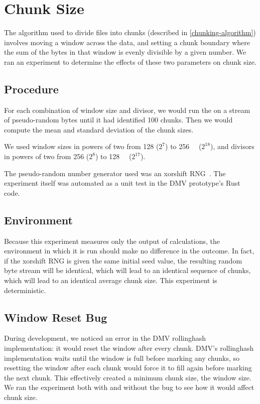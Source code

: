 \section{Chunk Size}\label{rolling-hash-exp}

The algorithm used to divide files into chunks (described in
\autoref{chunking-algorithm}) involves moving a window across the data, and
setting a chunk boundary where the sum of the bytes in that window is evenly
divisible by a given number. We ran an experiment to determine the effects of
these two parameters on chunk size.

\subsection{Procedure}

For each combination of window size and divisor, we would run the
 on a stream of pseudo-random bytes until it had
identified \num{100} chunks. Then we would compute the mean and standard
deviation of the chunk sizes.

We used window sizes in powers of two from \SI{128}{\byte} ($2^7$) to
\SI{256}{\kibi\byte} ($2^{18}$), and divisors in powers of two from \num{256}
($2^8$) to \SI{128}{\kibi\relax} ($2^{17}$).

The pseudo-random number generator used was an xorshift RNG~\cite{xorshift_rng}.
The experiment itself was automated as a unit test in the \gls{DMV} prototype's
Rust code.

\subsection{Environment}

Because this experiment measures only the output of calculations, the
environment in which it is run should make no difference in the outcome. In
fact, if the xorshift RNG is given the same initial seed value, the resulting
random byte stream will be identical, which will lead to an identical sequence
of chunks, which will lead to an identical average chunk size. This experiment
is deterministic.

\subsection{Window Reset Bug}

During development, we noticed an error in the DMV \gls{rollinghash}
implementation: it would reset the window after every chunk. DMV's
\gls{rollinghash} implementation waits until the window is full before marking
any chunks, so resetting the window after each chunk would force it to fill
again before marking the next chunk. This effectively created a minimum chunk
size, the window size. We ran the experiment both with and without the bug to
see how it would affect chunk size.

